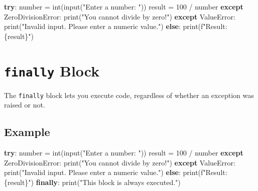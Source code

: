 \documentclass[
  letterpaper,
  DIV=11,
  numbers=noendperiod]{scrreprt}
\newenvironment{Shaded}{\begin{snugshade}}{\end{snugshade}}
\newcommand{\BuiltInTok}[1]{\textcolor[rgb]{0.00,0.23,0.31}{#1}}
\newcommand{\ControlFlowTok}[1]{\textcolor[rgb]{0.00,0.23,0.31}{\textbf{#1}}}
\newcommand{\DecValTok}[1]{\textcolor[rgb]{0.68,0.00,0.00}{#1}}
\newcommand{\NormalTok}[1]{\textcolor[rgb]{0.00,0.23,0.31}{#1}}
\newcommand{\OperatorTok}[1]{\textcolor[rgb]{0.37,0.37,0.37}{#1}}
\newcommand{\PreprocessorTok}[1]{\textcolor[rgb]{0.68,0.00,0.00}{#1}}
\newcommand{\SpecialCharTok}[1]{\textcolor[rgb]{0.37,0.37,0.37}{#1}}
\newcommand{\SpecialStringTok}[1]{\textcolor[rgb]{0.13,0.47,0.30}{#1}}
\newcommand{\StringTok}[1]{\textcolor[rgb]{0.13,0.47,0.30}{#1}}
\begin{document}
\begin{Shaded}
\begin{Highlighting}[]
\ControlFlowTok{try}\NormalTok{:}
\NormalTok{    number }\OperatorTok{=} \BuiltInTok{int}\NormalTok{(}\BuiltInTok{input}\NormalTok{(}\StringTok{"Enter a number: "}\NormalTok{))}
\NormalTok{    result }\OperatorTok{=} \DecValTok{100} \OperatorTok{/}\NormalTok{ number}
\ControlFlowTok{except} \PreprocessorTok{ZeroDivisionError}\NormalTok{:}
    \BuiltInTok{print}\NormalTok{(}\StringTok{"You cannot divide by zero!"}\NormalTok{)}
\ControlFlowTok{except} \PreprocessorTok{ValueError}\NormalTok{:}
    \BuiltInTok{print}\NormalTok{(}\StringTok{"Invalid input. Please enter a numeric value."}\NormalTok{)}
\ControlFlowTok{else}\NormalTok{:}
    \BuiltInTok{print}\NormalTok{(}\SpecialStringTok{f"Result: }\SpecialCharTok{\{}\NormalTok{result}\SpecialCharTok{\}}\SpecialStringTok{"}\NormalTok{)}
\end{Highlighting}
\end{Shaded}

\section{\texorpdfstring{\texttt{finally}
Block}{finally Block}}\label{finally-block}

The \texttt{finally} block lets you execute code, regardless of whether
an exception was raised or not.

\subsection{Example}\label{example-3}

\begin{Shaded}
\begin{Highlighting}[]
\ControlFlowTok{try}\NormalTok{:}
\NormalTok{    number }\OperatorTok{=} \BuiltInTok{int}\NormalTok{(}\BuiltInTok{input}\NormalTok{(}\StringTok{"Enter a number: "}\NormalTok{))}
\NormalTok{    result }\OperatorTok{=} \DecValTok{100} \OperatorTok{/}\NormalTok{ number}
\ControlFlowTok{except} \PreprocessorTok{ZeroDivisionError}\NormalTok{:}
    \BuiltInTok{print}\NormalTok{(}\StringTok{"You cannot divide by zero!"}\NormalTok{)}
\ControlFlowTok{except} \PreprocessorTok{ValueError}\NormalTok{:}
    \BuiltInTok{print}\NormalTok{(}\StringTok{"Invalid input. Please enter a numeric value."}\NormalTok{)}
\ControlFlowTok{else}\NormalTok{:}
    \BuiltInTok{print}\NormalTok{(}\SpecialStringTok{f"Result: }\SpecialCharTok{\{}\NormalTok{result}\SpecialCharTok{\}}\SpecialStringTok{"}\NormalTok{)}
\ControlFlowTok{finally}\NormalTok{:}
    \BuiltInTok{print}\NormalTok{(}\StringTok{"This block is always executed."}\NormalTok{)}
\end{Highlighting}
\end{Shaded}
\end{document}
